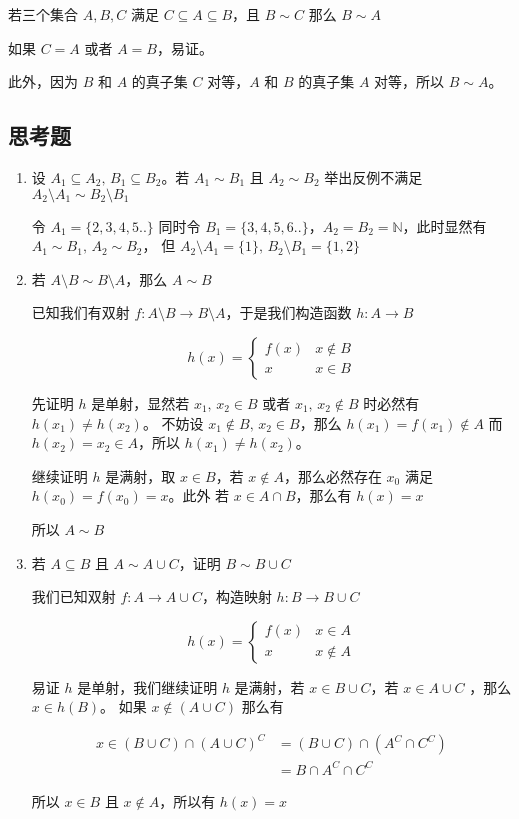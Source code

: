 \documentclass[12pt,a4paper]{ctexart}
\begin{document}
若三个集合 $A,B,C$ 满足 $C \subseteq A \subseteq B$，且 $B \sim C$ 那么 $B \sim A$

如果 $C = A$ 或者 $A = B$，易证。

此外，因为 $B$ 和 $A$ 的真子集 $C$ 对等，$A$ 和 $B$ 的真子集 $A$ 对等，所以 $B \sim A$。

\subsection{思考题}

\begin{enumerate}
    \item 设 $A_1 \subseteq A_2,\, B_1 \subseteq B_2$。若 $A_1 \sim B_1$ 且 $A_2 \sim B_2$ 举出反例不满足 $A_2 \setminus A_1 \sim B_2 \setminus B_1$

令 $A_1 = \{2,3,4,5 .. \}$ 同时令 $B_1 = \{3,4,5,6 .. \}$，$A_2 = B_2 = \mathbb{N}$，此时显然有 $A_1 \sim B_1,\, A_2 \sim B_2$，
但 $A_2 \setminus A_1 = \{ 1\},\, B_2 \setminus B_1 = \{ 1, 2\}$

    \item 若 $A \setminus B \sim B \setminus A$，那么 $A \sim B$
    
已知我们有双射 $f: A \setminus B \to B \setminus A$，于是我们构造函数 $h: A \to B$

\[
h(x) = \begin{cases}
    f(x) & x \notin B \\
    x & x \in B
\end{cases}
\]

先证明 $h$ 是单射，显然若 $x_1,\,x_2 \in B$ 或者 $x_1,\, x_2 \notin B$ 时必然有 $h(x_1) \ne h(x_2)$。
不妨设 $x_1 \notin B,\, x_2 \in B$，那么 $h(x_1) = f(x_1) \notin A$ 而 $h(x_2) = x_2 \in A$，所以 $h(x_1) \ne h(x_2)$。

继续证明 $h$ 是满射，取 $x \in B$，若 $x \notin A$，那么必然存在 $x_0$ 满足 $h(x_0) = f(x_0) = x$。此外
若 $x \in A \cap B$，那么有 $h(x) = x$

所以 $A \sim B$

\item 若 $A \subseteq B$ 且 $A \sim A \cup C$，证明 $B \sim B \cup C$

我们已知双射 $f: A  \to A \cup C$，构造映射 $h: B \to B \cup C$

\[
h(x) = \begin{cases}
    f(x) & x \in A \\
    x & x \notin A
\end{cases}
\]

易证 $h$ 是单射，我们继续证明 $h$ 是满射，若 $x \in B \cup C$，若 $x \in A \cup C$ ，那么 $x \in h(B)$。
如果 $x \notin (A \cup C)$ 那么有

\begin{align*}
x \in (B \cup C) \cap (A \cup C)^C &= (B \cup C) \cap (A^C \cap C^C)  \\
&= B \cap A^C \cap C^C
\end{align*}

所以 $x \in B$ 且 $x \notin A$，所以有 $h(x) = x$

\end{enumerate}
\end{document}

